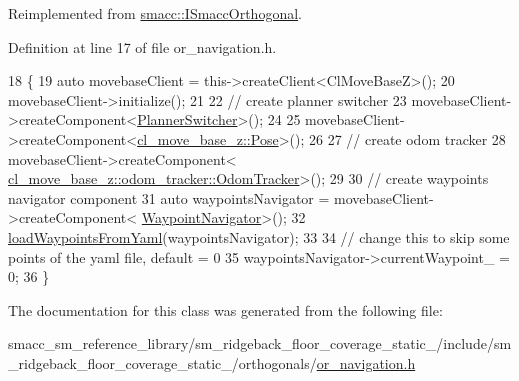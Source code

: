Reimplemented from \hyperlink{classsmacc_1_1ISmaccOrthogonal_a6bb31c620cb64dd7b8417f8705c79c7a}{smacc\+::\+I\+Smacc\+Orthogonal}.



Definition at line 17 of file or\+\_\+navigation.\+h.


\begin{DoxyCode}
18     \{
19         \textcolor{keyword}{auto} movebaseClient = this->createClient<ClMoveBaseZ>();
20         movebaseClient->initialize();
21 
22         \textcolor{comment}{// create planner switcher}
23         movebaseClient->createComponent<\hyperlink{classcl__move__base__z_1_1PlannerSwitcher}{PlannerSwitcher}>();
24 
25         movebaseClient->createComponent<\hyperlink{classcl__move__base__z_1_1Pose}{cl\_move\_base\_z::Pose}>();
26 
27         \textcolor{comment}{// create odom tracker}
28         movebaseClient->createComponent<
      \hyperlink{classcl__move__base__z_1_1odom__tracker_1_1OdomTracker}{cl\_move\_base\_z::odom\_tracker::OdomTracker}>();
29 
30         \textcolor{comment}{// create waypoints navigator component}
31         \textcolor{keyword}{auto} waypointsNavigator = movebaseClient->createComponent<
      \hyperlink{classcl__move__base__z_1_1WaypointNavigator}{WaypointNavigator}>();
32         \hyperlink{classsm__ridgeback__floor__coverage__static__1_1_1OrNavigation_a32f658f3d1ed7724f13fd30eb2139bbb}{loadWaypointsFromYaml}(waypointsNavigator);
33 
34         \textcolor{comment}{// change this to skip some points of the yaml file, default = 0}
35         waypointsNavigator->currentWaypoint\_ = 0;
36     \}
\end{DoxyCode}


The documentation for this class was generated from the following file\+:\begin{DoxyCompactItemize}
\item 
smacc\+\_\+sm\+\_\+reference\+\_\+library/sm\+\_\+ridgeback\+\_\+floor\+\_\+coverage\+\_\+static\+\_/include/sm\+\_\+ridgeback\+\_\+floor\+\_\+coverage\+\_\+static\+\_/orthogonals/\hyperlink{sm__ridgeback__floor__coverage__static__1_2include_2sm__ridgeback__floor__coverage__static__1_2orthogonals_2or__navigation_8h}{or\+\_\+navigation.\+h}\end{DoxyCompactItemize}

